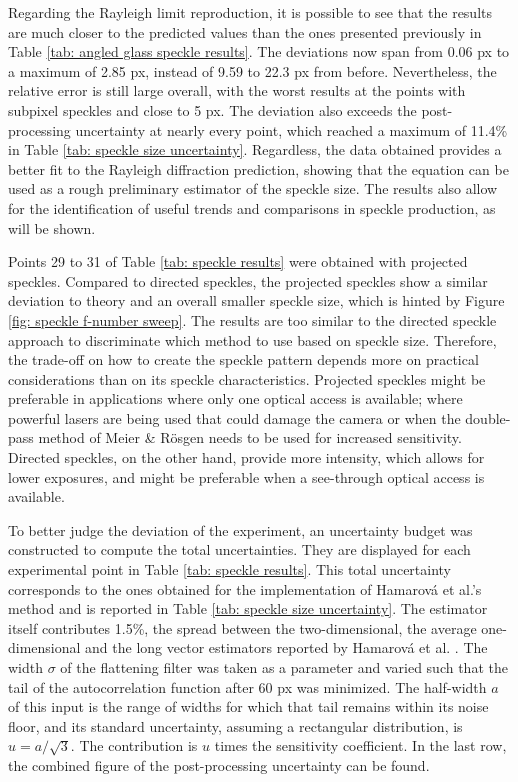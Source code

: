Regarding the Rayleigh limit reproduction, it is possible to see that the results are much closer to the predicted values than the ones presented previously in Table \ref{tab: angled glass speckle results}. The deviations now span from 0.06 px to a maximum of 2.85 px, instead of 9.59 to 22.3 px from before. Nevertheless, the relative error is still large overall, with the worst results at the points with subpixel speckles and close to 5 px. The deviation also exceeds the post-processing uncertainty at nearly every point, which reached a maximum of 11.4\% in Table \ref{tab: speckle size uncertainty}. Regardless, the data obtained provides a better fit to the Rayleigh diffraction prediction, showing that the equation can be used as a rough preliminary estimator of the speckle size. The results also allow for the identification of useful trends and comparisons in speckle production, as will be shown.

Points 29 to 31 of Table \ref{tab: speckle results} were obtained with projected speckles. Compared to directed speckles, the projected speckles show a similar deviation to theory and an overall smaller speckle size, which is hinted by Figure \ref{fig: speckle f-number sweep}. The results are too similar to the directed speckle approach to discriminate which method to use based on speckle size. Therefore, the trade-off on how to create the speckle pattern depends more on practical considerations than on its speckle characteristics. Projected speckles might be preferable in applications where only one optical access is available; where powerful lasers are being used that could damage the camera or when the double-pass method of Meier \& Rösgen \cite{Meier&Roesgen2013} needs to be used for increased sensitivity. Directed speckles, on the other hand, provide more intensity, which allows for lower exposures, and might be preferable when a see-through optical access is available.



To better judge the deviation of the experiment, an uncertainty budget was constructed to compute the total uncertainties. They are displayed for each experimental point in Table \ref{tab: speckle results}. This total uncertainty corresponds to the ones obtained for the implementation of Hamarová et al.'s method and is reported in Table \ref{tab: speckle size uncertainty}. The estimator itself contributes 1.5\%, the spread between the two-dimensional, the average one-dimensional and the long vector estimators reported by Hamarová et al. \cite{Hamarova2016}. The width $\sigma$ of the flattening filter was taken as a parameter and varied such that the tail of the autocorrelation function after 60 px was minimized. The half-width $a$ of this input is the range of widths for which that tail remains within its noise floor, and its standard uncertainty, assuming a rectangular distribution, is $u = a / \sqrt{3}$. The contribution is $u$ times the sensitivity coefficient. In the last row, the combined figure of the post-processing uncertainty can be found.

